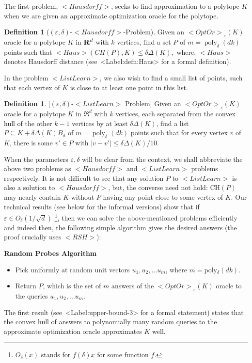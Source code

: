 \documentclass[11pt,letterpaper]{article}
\newcounter{note}[section]
\def\mathsf#1{<#1>}%
\def\xspace{}%
\def\Cref#1{<Label:#1>}%
\theoremstyle{definition}
\newtheorem{defn}[theorem]{Definition}
\theoremstyle{remark}
\newcommand{\poly}{\operatorname{poly}}
\newcommand{\Haus}{{\mathsf{Haus}}}
\newcommand{\rsh}{{\mathsf {RSH}}\xspace}
\newcommand{\ListLearn}{\mathsf {ListLearn}\xspace}
\newcommand{\Hausdorf}{\mathsf {Hausdorff}\xspace }
\newcommand{\opto}{{\mathsf{OptOr}}}
\begin{document}
The first problem, $\Hausdorf$, seeks to find approximation to a polytope $K$ when we are given an approximate optimization oracle for the polytope. 
\begin{defn}[$(\varepsilon,\delta)$-$\Hausdorf$-Problem]
\label{Hausdorf-problem}
Given an  $\opto_\varepsilon(K)$ oracle for a polytope $K$ in ${\bf R}^d$ with $k$ vertices, find a set $P$ of $m=\poly_\delta(dk)$ points such that $\Haus(CH(P),K)\leq \delta\Delta(K),$
where, $\Haus$ denotes Hausdorff distance (see~\Cref{defn:Haus} for a formal definition).    
\end{defn}

In the problem $\ListLearn$, we also wish to find a small list of points, such that each vertex of $K$ is close to at least one point in this list. 
\begin{defn}\label{LL}[$(\varepsilon,\delta)$-$\ListLearn$ Problem]
Given an $\opto_\varepsilon(K)$ oracle for a polytope $K$ in $\Re^d$ with $k$ vertices, each separated from the convex hull of the other $k-1$ vertices by at least $\delta\Delta(K)$, find a list $P\subseteq K+\delta \Delta(K) B_d$ of $m=\poly_\delta(dk)$ points 
such that for every vertex $v$ of $K$, there is some $v'\in P$ with $|v-v'|\leq\delta\Delta(K)/10.$
\end{defn}

When the parameters $\varepsilon, \delta$ will be clear from the context, we shall abbreviate the above two problems as $\Hausdorf$ and $\ListLearn$ problems respectively. It is not difficult to see that any solution $P$ to $\ListLearn$ is also a solution to $\Hausdorf$, but, the converse need not hold: CH$(P)$ may nearly contain $K$ without $P$ having any point close to some vertex of $K$. 
%
Our technical results (see below for the informal versions)
show that if $\varepsilon\in O_\delta(1/\sqrt d)$ \footnote{$O_\delta(x)$ stands for $f(\delta)x$ for some function $f$.}, then we can solve the above-mentioned problems efficiently  and indeed then, the following simple algorithm gives the desired answers (the proof crucially uses $\rsh$): 
\begin{framed}
{\bf  Random Probes Algorithm}
\begin{itemize}
    \item Pick uniformly at random unit vectors $u_1,u_2,\ldots u_m$, where $m=$poly$_\delta(dk)$.
    \item Return $P$, which is the set of $m$ answers of the $\opto_\varepsilon(K)$ oracle to the queries $u_1,u_2,\ldots u_m$. 
\end{itemize}
\end{framed}
The first result (see~\Cref{upper-bound-3} for a formal statement) states that the convex hull of answers to polynomially many random queries to the approximate optimization oracle approximates $K$ well. 
\end{document}
